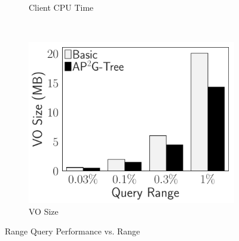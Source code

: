 \begin{figure}[t]
\begin{subfigure}{.33\linewidth}
        \caption{Client CPU Time}
    \end{subfigure}~%
    \begin{subfigure}{.33\linewidth}
        \includegraphics[width=\linewidth]{exp-figs/access-control/range_vo.pdf}
        \caption{VO Size}
    \end{subfigure}
    \caption{Range Query Performance vs. Range}\label{exp-fig:access-control:range}
\end{figure}
